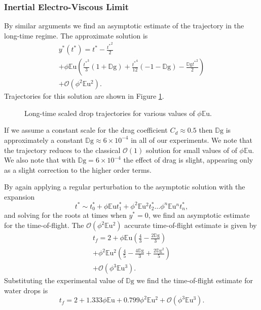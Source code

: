 \documentclass[aip,reprint, floatfix]{revtex4-1}
\begin{document}
\subsubsection{Inertial Electro-Viscous Limit}
By similar arguments we find an asymptotic estimate of the trajectory in the long-time regime. The approximate solution is 
\begin{gather*}
\label{perturb_viscous}
{y^*}({t^*}) = {t^*} - \frac{{t^*}^{2}}{2}  \nonumber \\
+ \phi\mathbb{E}\mbox{u} \left(\frac{{t^*}^{3}}{3} \left(1 + \mathbb{D}\mbox{g}\right) + \frac{{t^*}^{4}}{12} \left(-1 - \mathbb{D}\mbox{g}\right) - \frac{\mathbb{D}\mbox{g} {t^*}^{2}}{2}\right) \nonumber \\
 + \mathcal{O}(\phi^2 \mathbb{E}\mbox{u}^2). \nonumber
\end{gather*}
Trajectories for this solution are shown in Figure \ref{fig:long_times}.
\begin{figure}[htb]
    \centering
    \resizebox{0.5\textwidth}{!}{}
    \caption{Long-time scaled drop trajectories for various values of $\phi \mathbb{E}\mbox{u}$.}
     \label{fig:long_times}
\end{figure}
If we assume a constant scale for the drag coefficient $C_d \approx 0.5$ then $\mathbb{D}\mbox{g}$ is approximately a constant $\mathbb{D}\mbox{g} \approx 6 \times 10^{-4}$ in all of our experiments. We note that the trajectory reduces to the classical $\mathcal{O}(1)$ solution for small values of of $\phi \mathbb{E}\mbox{u}$. We also note that with $\mathbb{D}\mbox{g} = 6 \times 10^{-4}$ the effect of drag is slight, appearing only as a slight correction to the higher order terms.
 
By again applying a regular perturbation to the asymptotic solution with the expansion
\[ t^* \sim t^*_0 + \phi \mathbb{E}\mbox{u} t^*_1 + \phi^2 \mathbb{E}\mbox{u}^2 t^*_2 \ldots \phi^n \mathbb{E}\mbox{u}^n t^*_n  
,\]
and solving for the roots at times when $y^* = 0$, we find an asymptotic estimate for the time-of-flight. The $\mathcal{O}(\phi^2 \mathbb{E}\mbox{u}^2)$ accurate time-of-flight estimate is given by
\begin{gather*}
t_f = 2 + \phi \mathbb{E}\mbox{u} \left(\frac{4}{3} - \frac{2 \mathbb{D}\mbox{g}}{3}\right) \\
+ \phi^2 \mathbb{E}\mbox{u}^{2} \left(\frac{4}{5} - \frac{4 \mathbb{D}\mbox{g}}{3} + \frac{2 \mathbb{D}\mbox{g}^{2}}{5}\right) \\
+ \mathcal{O}(\phi^3 \mathbb{E}\mbox{u}^3).
\end{gather*}
Substituting the experimental value of $\mathbb{D}\mbox{g}$ we find the time-of-flight estimate for water drops is
\begin{equation} \label{time_of_flight}
t_f = 2 + 1.333 \phi \mathbb{E}\mbox{u} + 0.799 \phi^2 \mathbb{E}\mbox{u}^{2} + \mathcal{O}(\phi^3 \mathbb{E}\mbox{u}^3). 
\end{equation} 
\end{document}
